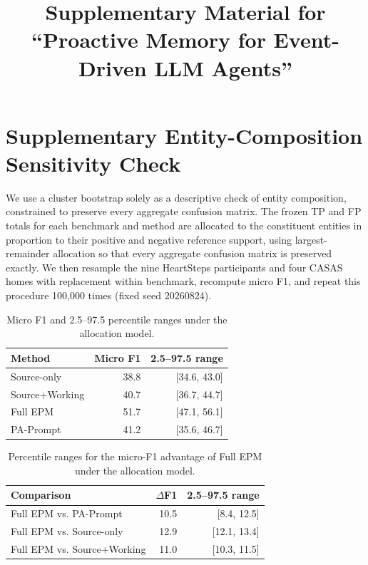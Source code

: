 \documentclass[sigconf,anonymous,review]{acmart}
\title{Supplementary Material for ``Proactive Memory for Event-Driven LLM Agents''}
\newcommand{\system}{EPM}
\begin{document}
\maketitle

\section{Supplementary Entity-Composition Sensitivity Check}

We use a cluster bootstrap solely as a descriptive check of entity composition,
constrained to preserve every aggregate confusion matrix.  The frozen TP and FP
totals for each benchmark and method are allocated to the
constituent entities in proportion to their positive and negative reference
support, using largest-remainder allocation so that every aggregate confusion
matrix is preserved exactly.  We then resample the nine HeartSteps participants
and four CASAS homes with replacement within benchmark, recompute micro F1, and
repeat this procedure 100,000 times (fixed seed 20260824).

\begin{table}[h]
\centering
\caption{Micro F1 and 2.5--97.5 percentile ranges under the allocation model.}
\label{tab:supp_method_ci}
\small
\begin{tabular}{lrr}
\toprule
Method & Micro F1 & 2.5--97.5 range \\
\midrule
Source-only & 38.8 & [34.6, 43.0] \\
Source+Working & 40.7 & [36.7, 44.7] \\
Full \system{} & 51.7 & [47.1, 56.1] \\
PA-Prompt & 41.2 & [35.6, 46.7] \\
\bottomrule
\end{tabular}
\end{table}

\begin{table}[h]
\centering
\caption{Percentile ranges for the micro-F1 advantage of Full \system{} under the allocation model.}
\label{tab:supp_delta_ci}
\small
\begin{tabular}{lrr}
\toprule
Comparison & $\Delta$F1 & 2.5--97.5 range \\
\midrule
Full \system{} vs. PA-Prompt & 10.5 & [8.4, 12.5] \\
Full \system{} vs. Source-only & 12.9 & [12.1, 13.4] \\
Full \system{} vs. Source+Working & 11.0 & [10.3, 11.5] \\
\bottomrule
\end{tabular}
\end{table}
\end{document}
